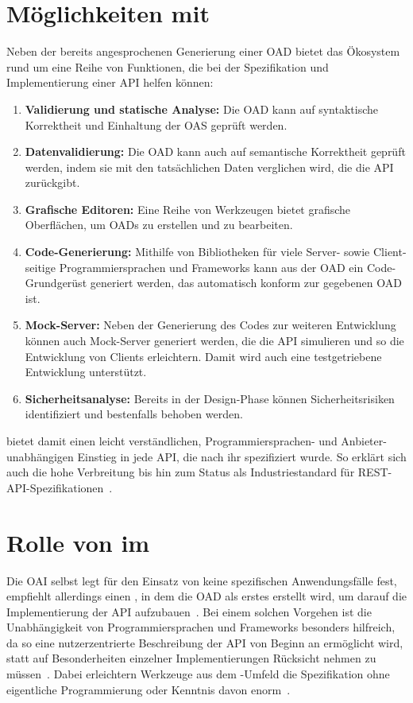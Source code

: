 \section{Möglichkeiten mit \OA}
Neben der bereits angesprochenen Generierung einer \ac{OAD} bietet das Ökosystem rund um \OA eine Reihe von Funktionen, die bei der Spezifikation und Implementierung einer \ac{API} helfen können:
\begin{enumerate}
	\item \textbf{Validierung und statische Analyse:} Die \ac{OAD} kann auf syntaktische Korrektheit und Einhaltung der \ac{OAS} geprüft werden.
	\item \textbf{Datenvalidierung:} Die \ac{OAD} kann auch auf semantische Korrektheit geprüft werden, indem sie mit den tatsächlichen Daten verglichen wird, die die \ac{API} zurückgibt.
	\item \textbf{Grafische Editoren:} Eine Reihe von Werkzeugen bietet grafische Oberflächen, um \acp{OAD} zu erstellen und zu bearbeiten.
	\item \textbf{Code-Generierung:} Mithilfe von Bibliotheken für viele Server- sowie Client-seitige Programmiersprachen und Frameworks kann aus der \ac{OAD} ein Code-Grundgerüst generiert werden, das automatisch konform zur gegebenen \ac{OAD} ist.
	\item \textbf{Mock-Server:} Neben der Generierung des Codes zur weiteren Entwicklung können auch Mock-Server generiert werden, die die \ac{API} simulieren und so die Entwicklung von Clients erleichtern. Damit wird auch eine testgetriebene Entwicklung unterstützt.
	\item \textbf{Sicherheitsanalyse:} Bereits in der Design-Phase können Sicherheitsrisiken identifiziert und bestenfalls behoben werden.
\end{enumerate}\cite{ope23}

\OA bietet damit einen leicht verständlichen, Programmiersprachen- und Anbieter-unabhängigen Einstieg in jede \ac{API}, die nach ihr spezifiziert wurde.
So erklärt sich auch die hohe Verbreitung bis hin zum Status als Industriestandard für \acs{REST}-\acs{API}-Spezifikationen~\cite{ope}.

\section{Rolle von \OA im \AFA}
Die \ac{OAI} selbst legt für den Einsatz von \OA keine spezifischen Anwendungsfälle fest, empfiehlt allerdings einen \AFA, in dem die \ac{OAD} als erstes erstellt wird, um darauf die Implementierung der \ac{API} aufzubauen~\cites{ope,ope24}.
Bei einem solchen Vorgehen ist die Unabhängigkeit von Programmiersprachen und Frameworks besonders hilfreich, da so eine nutzerzentrierte Beschreibung der \ac{API} von Beginn an ermöglicht wird, statt auf Besonderheiten einzelner Implementierungen Rücksicht nehmen zu müssen~\cite{ope}.
Dabei erleichtern Werkzeuge aus dem \OA-Umfeld die Spezifikation ohne eigentliche Programmierung oder Kenntnis davon enorm~\cites[1629]{cha21}{ope24}.

